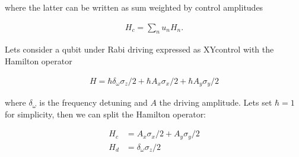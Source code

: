 \documentclass[letterpaper,10pt,english]{sphinxmanual}
\begin{document}
where the latter can be written as sum weighted by control amplitudes

\begin{align*}
H_c = \sum_n u_n H_n.
\end{align*}

Lets consider a qubit under Rabi driving expressed as XY\sphinxhyphen{}control with the Hamilton operator

\begin{align*}
H = \hbar \delta_\omega \sigma_z / 2 + \hbar A_x \sigma_x / 2
+ \hbar A_y \sigma_y / 2
\end{align*}

where \(\delta_\omega\) is the frequency detuning and \(A\) the driving amplitude. Lets set \(\hbar = 1\) for simplicity, then we can split the Hamilton operator:

\begin{align*}
H_c &= A_x \sigma_x / 2 + A_y \sigma_y / 2 \\
H_d &= \delta_\omega \sigma_z / 2
\end{align*}
\end{document}
